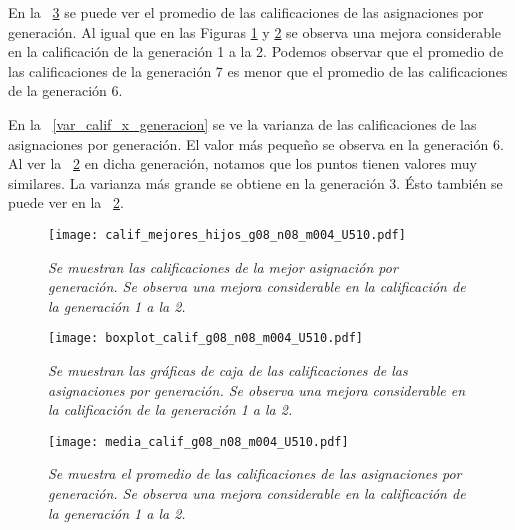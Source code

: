 En la \figurename{~\ref{media_calif_x_generacion}} se puede ver el promedio de las calificaciones de las asignaciones por generación. Al igual que en las Figuras \ref{EjcalifMejoresHijos} y \ref{boxplot_calif_x_generacion} se observa una mejora considerable en la calificación de la generación 1 a la 2. Podemos observar que el promedio de las calificaciones de la generación 7 es menor que el promedio de las calificaciones de la generación 6.



En la \figurename{~\ref{var_calif_x_generacion}} se ve la varianza de las calificaciones de las asignaciones por generación. El valor más pequeño se observa en la generación 6. Al ver la \figurename{~\ref{boxplot_calif_x_generacion}} en dicha generación, notamos que los puntos tienen valores muy similares. La varianza más grande se obtiene en la generación 3. Ésto también se puede ver en la \figurename{~\ref{boxplot_calif_x_generacion}}.


\begin{figure}[H]
\centering
\texttt{[image: calif\_mejores\_hijos\_g08\_n08\_m004\_U510.pdf]} %
\caption[\textit{Calificaciones de las mejores asignaciones por generación}]{\textit{Se muestran las calificaciones de la mejor asignación por generación. Se observa una mejora considerable en la calificación de la generación 1 a la 2.}}\label{EjcalifMejoresHijos}
\end{figure}


\begin{figure}[H]
\centering
\texttt{[image: boxplot\_calif\_g08\_n08\_m004\_U510.pdf]} %
\caption[\textit{Gráficas de caja de calificaciones de asignaciones por generación}]{\textit{Se muestran las gráficas de caja de las calificaciones de las asignaciones por generación. Se observa una mejora considerable en la calificación de la generación 1 a la 2.}}\label{boxplot_calif_x_generacion}
\end{figure}

\begin{figure}[H]
\centering
\texttt{[image: media\_calif\_g08\_n08\_m004\_U510.pdf]} %
\caption[\textit{Media de calificaciones de asignaciones por generación}]{\textit{Se muestra el promedio de las calificaciones de las asignaciones por generación. Se observa una mejora considerable en la calificación de la generación 1 a la 2.}}\label{media_calif_x_generacion}
\end{figure}


